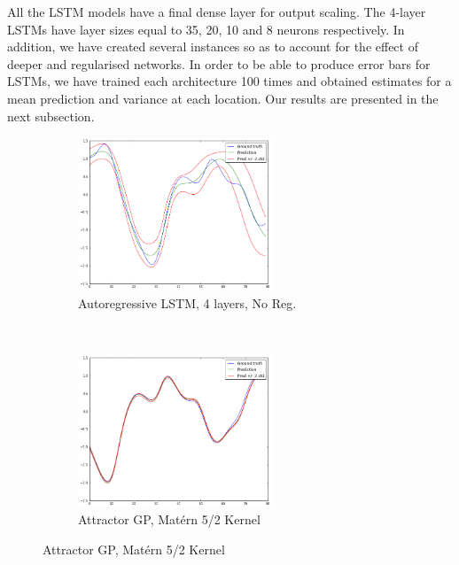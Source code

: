 \documentclass[pdftex,10pt,a4paper,journal]{article}
\theoremstyle{definition}
\theoremstyle{remark}
\begin{document}
\begin{multicols}{2}
\par All the LSTM models have a final dense layer for output scaling. The 4-layer LSTMs have layer sizes equal to 35, 20, 10 and 8 neurons respectively. In addition, we have created several instances so as to account for the effect of deeper and regularised networks. In order to be able to produce error bars for LSTMs, we have trained each architecture 100 times and obtained estimates for a mean prediction and variance at each location. Our results are presented in the next subsection.

\begin{figure}[ht] 
    \centering
    \begin{subfigure}[t]{0.5\textwidth}
        \centering
        \includegraphics[height=1.8in]{figs/mg_lstm.png}
        \caption{Autoregressive LSTM, 4 layers, No Reg.}
    \end{subfigure}%
    ~ 
    \begin{subfigure}[t]{0.5\textwidth}
        \centering
        \includegraphics[height=1.8in]{figs/mg_gpatt52.png}
        \caption{Attractor GP, Mat\'ern 5/2 Kernel}
    \end{subfigure}


\end{figure}
\end{multicols}
\end{document}
